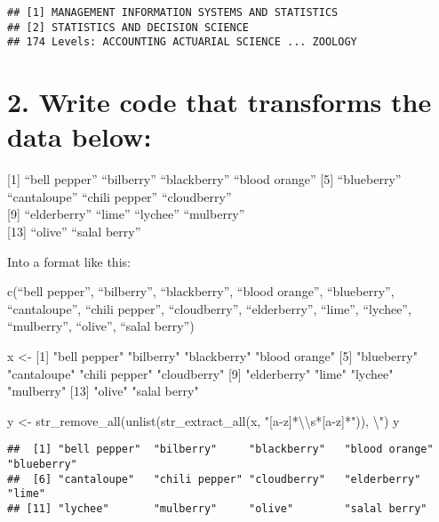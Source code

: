 \documentclass[
]{article}
\newenvironment{Shaded}{\begin{snugshade}}{\end{snugshade}}
\newcommand{\FunctionTok}[1]{\textcolor[rgb]{0.00,0.00,0.00}{#1}}
\newcommand{\NormalTok}[1]{#1}
\newcommand{\OtherTok}[1]{\textcolor[rgb]{0.56,0.35,0.01}{#1}}
\newcommand{\SpecialCharTok}[1]{\textcolor[rgb]{0.00,0.00,0.00}{#1}}
\newcommand{\StringTok}[1]{\textcolor[rgb]{0.31,0.60,0.02}{#1}}
\begin{document}
\begin{verbatim}
## [1] MANAGEMENT INFORMATION SYSTEMS AND STATISTICS
## [2] STATISTICS AND DECISION SCIENCE              
## 174 Levels: ACCOUNTING ACTUARIAL SCIENCE ... ZOOLOGY
\end{verbatim}

\hypertarget{write-code-that-transforms-the-data-below}{%
\section{2. Write code that transforms the data
below:}\label{write-code-that-transforms-the-data-below}}

{[}1{]} ``bell pepper'' ``bilberry'' ``blackberry'' ``blood orange''
{[}5{]} ``blueberry'' ``cantaloupe'' ``chili pepper'' ``cloudberry''\\
{[}9{]} ``elderberry'' ``lime'' ``lychee'' ``mulberry''\\
{[}13{]} ``olive'' ``salal berry''

Into a format like this:

c(``bell pepper'', ``bilberry'', ``blackberry'', ``blood orange'',
``blueberry'', ``cantaloupe'', ``chili pepper'', ``cloudberry'',
``elderberry'', ``lime'', ``lychee'', ``mulberry'', ``olive'', ``salal
berry'')

\begin{Shaded}
\begin{Highlighting}[]
\NormalTok{x }\OtherTok{\textless{}{-}} \StringTok{\textquotesingle{}[1] "bell pepper"  "bilberry"     "blackberry"   "blood orange"  }
\StringTok{[5] "blueberry"    "cantaloupe"   "chili pepper" "cloudberry"  }
\StringTok{[9] "elderberry"   "lime"         "lychee"       "mulberry"    }
\StringTok{[13] "olive"        "salal berry"\textquotesingle{}}

\NormalTok{y }\OtherTok{\textless{}{-}} \FunctionTok{str\_remove\_all}\NormalTok{(}\FunctionTok{unlist}\NormalTok{(}\FunctionTok{str\_extract\_all}\NormalTok{(x, }\StringTok{\textquotesingle{}"[a{-}z]*}\SpecialCharTok{\textbackslash{}\textbackslash{}}\StringTok{s*[a{-}z]*"\textquotesingle{}}\NormalTok{)), }\StringTok{\textquotesingle{}}\SpecialCharTok{\textbackslash{}"}\StringTok{\textquotesingle{}}\NormalTok{)}
\NormalTok{y}
\end{Highlighting}
\end{Shaded}

\begin{verbatim}
##  [1] "bell pepper"  "bilberry"     "blackberry"   "blood orange" "blueberry"   
##  [6] "cantaloupe"   "chili pepper" "cloudberry"   "elderberry"   "lime"        
## [11] "lychee"       "mulberry"     "olive"        "salal berry"
\end{verbatim}
\end{document}
